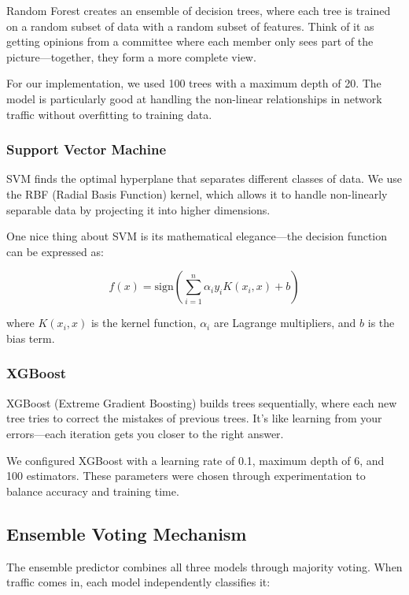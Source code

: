 \documentclass[conference]{IEEEtran}
\begin{document}
Random Forest creates an ensemble of decision trees, where each tree is trained on a random subset of data with a random subset of features. Think of it as getting opinions from a committee where each member only sees part of the picture—together, they form a more complete view.

For our implementation, we used 100 trees with a maximum depth of 20. The model is particularly good at handling the non-linear relationships in network traffic without overfitting to training data.

\subsubsection{Support Vector Machine}

SVM finds the optimal hyperplane that separates different classes of data. We use the RBF (Radial Basis Function) kernel, which allows it to handle non-linearly separable data by projecting it into higher dimensions.

One nice thing about SVM is its mathematical elegance—the decision function can be expressed as:

\begin{equation}
f(x) = \text{sign}\left(\sum_{i=1}^{n} \alpha_i y_i K(x_i, x) + b\right)
\end{equation}

where $K(x_i, x)$ is the kernel function, $\alpha_i$ are Lagrange multipliers, and $b$ is the bias term.

\subsubsection{XGBoost}

XGBoost (Extreme Gradient Boosting) builds trees sequentially, where each new tree tries to correct the mistakes of previous trees. It's like learning from your errors—each iteration gets you closer to the right answer.

We configured XGBoost with a learning rate of 0.1, maximum depth of 6, and 100 estimators. These parameters were chosen through experimentation to balance accuracy and training time.

\subsection{Ensemble Voting Mechanism}

The ensemble predictor combines all three models through majority voting. When traffic comes in, each model independently classifies it:
\end{document}
